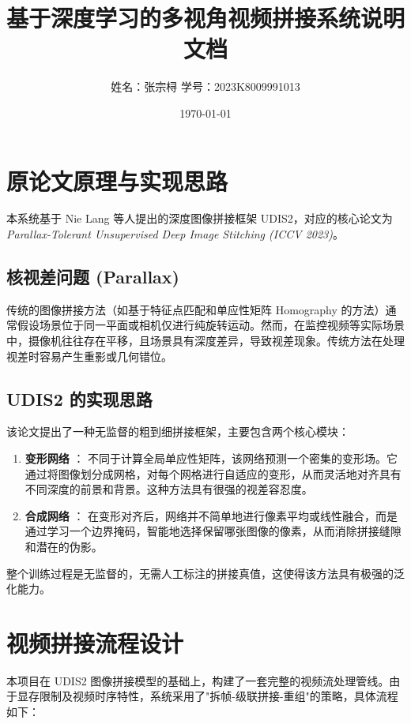 \documentclass[a4paper,12pt]{article}
\title{\textbf{基于深度学习的多视角视频拼接系统说明文档}}
\author{姓名：张宗桪 \quad 学号：2023K8009991013} %
\date{\today}
\begin{document}
\maketitle

\section{原论文原理与实现思路}

本系统基于 Nie Lang 等人提出的深度图像拼接框架 UDIS2，对应的核心论文为 \textit{Parallax-Tolerant Unsupervised Deep Image Stitching (ICCV 2023)}。

\subsection{核视差问题 (Parallax)}
传统的图像拼接方法（如基于特征点匹配和单应性矩阵 Homography 的方法）通常假设场景位于同一平面或相机仅进行纯旋转运动。然而，在监控视频等实际场景中，摄像机往往存在平移，且场景具有深度差异，导致视差现象。传统方法在处理视差时容易产生重影或几何错位。

\subsection{UDIS2 的实现思路}
该论文提出了一种无监督的粗到细拼接框架，主要包含两个核心模块：

\begin{enumerate}
    \item \textbf{变形网络 }：
    不同于计算全局单应性矩阵，该网络预测一个密集的变形场。它通过将图像划分成网格，对每个网格进行自适应的变形，从而灵活地对齐具有不同深度的前景和背景。这种方法具有很强的视差容忍度。
    
    \item \textbf{合成网络 }：
    在变形对齐后，网络并不简单地进行像素平均或线性融合，而是通过学习一个边界掩码，智能地选择保留哪张图像的像素，从而消除拼接缝隙和潜在的伪影。
\end{enumerate}

整个训练过程是无监督的，无需人工标注的拼接真值，这使得该方法具有极强的泛化能力。

\section{视频拼接流程设计}

本项目在 UDIS2 图像拼接模型的基础上，构建了一套完整的视频流处理管线。由于显存限制及视频时序特性，系统采用了"拆帧-级联拼接-重组"的策略，具体流程如下：
\end{document}

